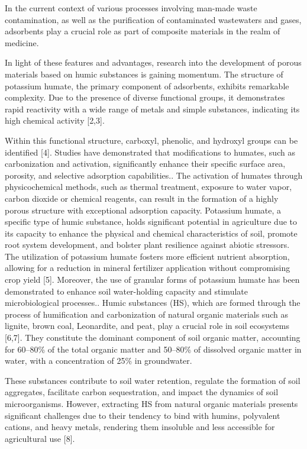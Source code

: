 \begin{multicols}{2}
In the current context of various processes involving man-made waste
contamination, as well as the purification of contaminated wastewaters
and gases, adsorbents play a crucial role as part of composite materials
in the realm of medicine.

In light of these features and advantages, research into the development
of porous materials based on humic substances is gaining momentum. The
structure of potassium humate, the primary component of adsorbents,
exhibits remarkable complexity. Due to the presence of diverse
functional groups, it demonstrates rapid reactivity with a wide range of
metals and simple substances, indicating its high chemical activity
{[}2,3{]}.

Within this functional structure, carboxyl, phenolic, and hydroxyl
groups can be identified {[}4{]}. Studies have demonstrated that
modifications to humates, such as carbonization and activation,
significantly enhance their specific surface area, porosity, and
selective adsorption capabilities.. The activation of humates through
physicochemical methods, such as thermal treatment, exposure to water
vapor, carbon dioxide or chemical reagents, can result in the formation
of a highly porous structure with exceptional adsorption capacity.
Potassium humate, a specific type of humic substance, holds significant
potential in agriculture due to its capacity to enhance the physical and
chemical characteristics of soil, promote root system development, and
bolster plant resilience against abiotic stressors. The utilization of
potassium humate fosters more efficient nutrient absorption, allowing
for a reduction in mineral fertilizer application without compromising
crop yield {[}5{]}. Moreover, the use of granular forms of potassium
humate has been demonstrated to enhance soil water-holding capacity and
stimulate microbiological processes.. Humic substances (HS), which are
formed through the process of humification and carbonization of natural
organic materials such as lignite, brown coal, Leonardite, and peat,
play a crucial role in soil ecosystems {[}6,7{]}. They constitute the
dominant component of soil organic matter, accounting for 60--80\% of
the total organic matter and 50--80\% of dissolved organic matter in
water, with a concentration of 25\% in groundwater.

These substances contribute to soil water retention, regulate the
formation of soil aggregates, facilitate carbon sequestration, and
impact the dynamics of soil microorganisms. However, extracting HS from
natural organic materials presents significant challenges due to their
tendency to bind with humins, polyvalent cations, and heavy metals,
rendering them insoluble and less accessible for agricultural use
{[}8{]}.


\end{multicols}
